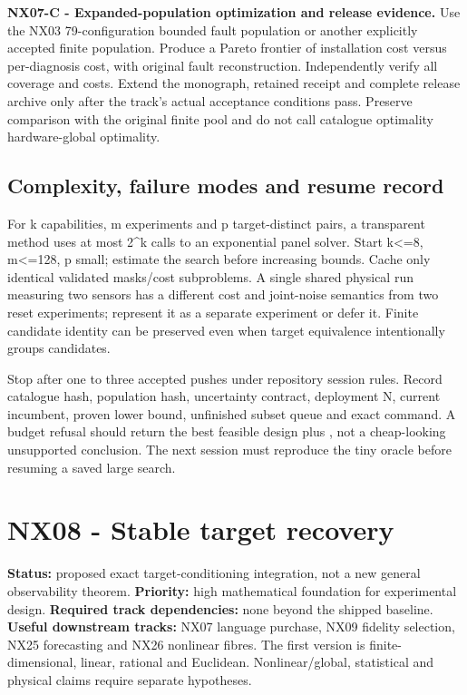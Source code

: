 \documentclass[
  11pt,
  a4paper,
]{report}
\let\nxtexttt\texttt
\renewcommand{\texttt}[1]{\nxtexttt{\seqsplit{#1}}}
\begin{document}
\textbf{NX07-C - Expanded-population optimization and release evidence.}
Use the NX03 79-configuration bounded fault population or another
explicitly accepted finite population. Produce a Pareto frontier of
installation cost versus per-diagnosis cost, with original fault
reconstruction. Independently verify all coverage and costs. Extend the
monograph, retained receipt and complete release archive only after the
track's actual acceptance conditions pass. Preserve comparison with the
original finite pool and do not call catalogue optimality
hardware-global optimality.

\hypertarget{complexity-failure-modes-and-resume-record}{%
\section{Complexity, failure modes and resume
record}\label{complexity-failure-modes-and-resume-record}}

For k capabilities, m experiments and p target-distinct pairs, a
transparent method uses at most 2\^{}k calls to an exponential panel
solver. Start k\textless=8, m\textless=128, p small; estimate the search
before increasing bounds. Cache only identical validated masks/cost
subproblems. A single shared physical run measuring two sensors has a
different cost and joint-noise semantics from two reset experiments;
represent it as a separate experiment or defer it. Finite candidate
identity can be preserved even when target equivalence intentionally
groups candidates.

Stop after one to three accepted pushes under repository session rules.
Record catalogue hash, population hash, uncertainty contract, deployment
N, current incumbent, proven lower bound, unfinished subset queue and
exact command. A budget refusal should return the best feasible design
plus \texttt{optimality\_unresolved}, not a cheap-looking unsupported
conclusion. The next session must reproduce the tiny oracle before
resuming a saved large search.

\hypertarget{nx08---stable-target-recovery}{%
\chapter{NX08 - Stable target
recovery}\label{nx08---stable-target-recovery}}

\textbf{Status:} proposed exact target-conditioning integration, not a
new general observability theorem. \textbf{Priority:} high mathematical
foundation for experimental design. \textbf{Required track
dependencies:} none beyond the shipped baseline. \textbf{Useful
downstream tracks:} NX07 language purchase, NX09 fidelity selection,
NX25 forecasting and NX26 nonlinear fibres. The first version is
finite-dimensional, linear, rational and Euclidean. Nonlinear/global,
statistical and physical claims require separate hypotheses.
\end{document}
